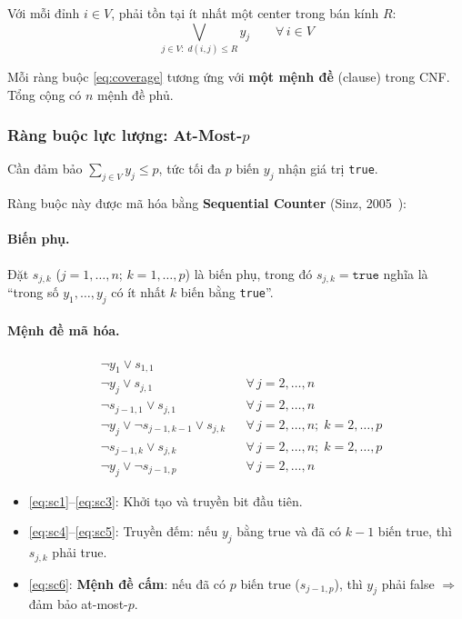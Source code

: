 \documentclass[11pt,a4paper]{article}
\begin{document}
Với mỗi đỉnh $i \in V$, phải tồn tại ít nhất một center trong bán kính $R$:
\begin{equation}
    \bigvee_{j \in V:\; d(i,j) \le R} y_j \qquad \forall\, i \in V
    \label{eq:coverage}
\end{equation}

Mỗi ràng buộc \eqref{eq:coverage} tương ứng với \textbf{một mệnh đề} (clause) trong CNF.
Tổng cộng có $n$ mệnh đề phủ.

\subsubsection{Ràng buộc lực lượng: At-Most-$p$}

Cần đảm bảo $\sum_{j \in V} y_j \le p$, tức tối đa $p$ biến $y_j$ nhận giá trị \texttt{true}.

Ràng buộc này được mã hóa bằng \textbf{Sequential Counter} (Sinz, 2005~\cite{sinz2005towards}):

\paragraph{Biến phụ.}
Đặt $s_{j,k}$ ($j = 1, \dots, n$; $k = 1, \dots, p$) là biến phụ, trong đó $s_{j,k} = \texttt{true}$ nghĩa là ``trong số $y_1, \dots, y_j$ có ít nhất $k$ biến bằng \texttt{true}''.

\paragraph{Mệnh đề mã hóa.}
\begin{align}
    & \neg y_1 \lor s_{1,1} \label{eq:sc1} \\
    & \neg y_j \lor s_{j,1} && \forall\, j = 2, \dots, n \label{eq:sc2} \\
    & \neg s_{j-1,1} \lor s_{j,1} && \forall\, j = 2, \dots, n \label{eq:sc3} \\
    & \neg y_j \lor \neg s_{j-1,k-1} \lor s_{j,k} && \forall\, j = 2, \dots, n;\; k = 2, \dots, p \label{eq:sc4} \\
    & \neg s_{j-1,k} \lor s_{j,k} && \forall\, j = 2, \dots, n;\; k = 2, \dots, p \label{eq:sc5} \\
    & \neg y_j \lor \neg s_{j-1,p} && \forall\, j = 2, \dots, n \label{eq:sc6}
\end{align}

\begin{itemize}[nosep]
    \item \eqref{eq:sc1}--\eqref{eq:sc3}: Khởi tạo và truyền bit đầu tiên.
    \item \eqref{eq:sc4}--\eqref{eq:sc5}: Truyền đếm: nếu $y_j$ bằng true và đã có $k-1$ biến true, thì $s_{j,k}$ phải true.
    \item \eqref{eq:sc6}: \textbf{Mệnh đề cấm}: nếu đã có $p$ biến true ($s_{j-1,p}$), thì $y_j$ phải false $\Rightarrow$ đảm bảo at-most-$p$.
\end{itemize}
\end{document}
